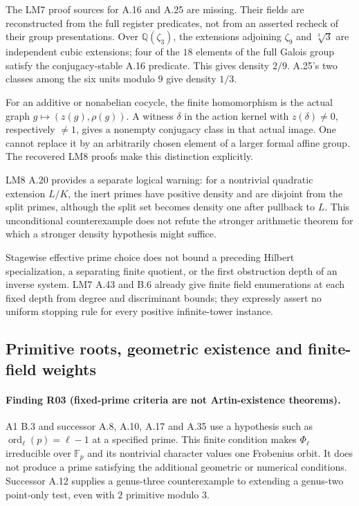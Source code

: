 The LM7 proof sources for A.16 and A.25 are missing. Their fields are
reconstructed from the full register predicates, not from an asserted
recheck of their group presentations. Over $\mathbb Q(\zeta_3)$, the
extensions adjoining $\zeta_9$ and $\sqrt[3]3$ are independent cubic
extensions; four of the $18$ elements of the full Galois group satisfy
the conjugacy-stable A.16 predicate. This gives density $2/9$.
A.25's two classes among the six units modulo $9$ give density $1/3$.

For an additive or nonabelian cocycle, the finite homomorphism is the
actual graph $g\mapsto(z(g),\rho(g))$. A witness $\delta$ in the
action kernel with $z(\delta)\ne0$, respectively $\ne1$, gives a
nonempty conjugacy class in that actual image. One cannot replace it
by an arbitrarily chosen element of a larger formal affine group.
The recovered LM8 proofs make this distinction explicitly.

LM8 A.20 provides a separate logical warning: for a nontrivial quadratic
extension $L/K$, the inert primes have positive density and are
disjoint from the split primes, although the split set becomes
density one after pullback to $L$. This unconditional counterexample
does not refute the stronger arithmetic theorem for which a stronger
density hypothesis might suffice.

Stagewise effective prime choice does not bound a preceding Hilbert
specialization, a separating finite quotient, or the first obstruction
depth of an inverse system. LM7 A.43 and B.6 already give finite
field enumerations at each fixed depth from degree and discriminant
bounds; they expressly assert no uniform stopping rule for every
positive infinite-tower instance.

\subsection{Primitive roots, geometric existence and finite-field weights}

\paragraph{Finding R03 (fixed-prime criteria are not Artin-existence theorems).}
A1 B.3 and successor A.8, A.10, A.17 and A.35 use a hypothesis such as
$\operatorname{ord}_\ell(p)=\ell-1$ at a specified prime. This finite
condition makes $\Phi_\ell$ irreducible over $\mathbb F_p$ and its
nontrivial character values one Frobenius orbit. It does not produce
a prime satisfying the additional geometric or numerical conditions.
Successor A.12 supplies a genus-three counterexample to extending a
genus-two point-only test, even with $2$ primitive modulo $3$.


